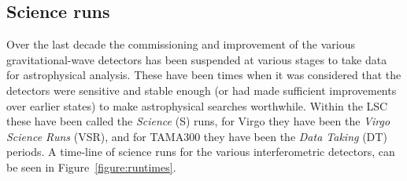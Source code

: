 \subsection{Science runs}
\label{subsection:runs} 

Over the last decade the commissioning and improvement of the various
gravitational-wave detectors has been suspended at various stages to take data
for astrophysical analysis. These have been times when it was considered that
the detectors were sensitive and stable enough (or had made sufficient
improvements over earlier states) to make astrophysical searches worthwhile.
Within the LSC these have been called the \textit{Science} (S) runs, for Virgo they
have been the \textit{Virgo Science Runs} (VSR), and for TAMA300 they have been
the \textit{Data Taking} (DT) periods. A time-line of science runs for the various
interferometric detectors, can be seen in Figure~\ref{figure:runtimes}.
